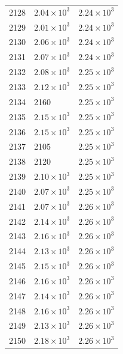 \begin{table}[H]
\begin{tabular}{lll}
2128 & $\displaystyle 2.04 \times 10^{3}$ & $\displaystyle 2.24 \times 10^{3}$ \\
2129 & $\displaystyle 2.01 \times 10^{3}$ & $\displaystyle 2.24 \times 10^{3}$ \\
2130 & $\displaystyle 2.06 \times 10^{3}$ & $\displaystyle 2.24 \times 10^{3}$ \\
2131 & $\displaystyle 2.07 \times 10^{3}$ & $\displaystyle 2.24 \times 10^{3}$ \\
2132 & $\displaystyle 2.08 \times 10^{3}$ & $\displaystyle 2.25 \times 10^{3}$ \\
2133 & $\displaystyle 2.12 \times 10^{3}$ & $\displaystyle 2.25 \times 10^{3}$ \\
2134 & 2160 & $\displaystyle 2.25 \times 10^{3}$ \\
2135 & $\displaystyle 2.15 \times 10^{3}$ & $\displaystyle 2.25 \times 10^{3}$ \\
2136 & $\displaystyle 2.15 \times 10^{3}$ & $\displaystyle 2.25 \times 10^{3}$ \\
2137 & 2105 & $\displaystyle 2.25 \times 10^{3}$ \\
2138 & 2120 & $\displaystyle 2.25 \times 10^{3}$ \\
2139 & $\displaystyle 2.10 \times 10^{3}$ & $\displaystyle 2.25 \times 10^{3}$ \\
2140 & $\displaystyle 2.07 \times 10^{3}$ & $\displaystyle 2.25 \times 10^{3}$ \\
2141 & $\displaystyle 2.07 \times 10^{3}$ & $\displaystyle 2.26 \times 10^{3}$ \\
2142 & $\displaystyle 2.14 \times 10^{3}$ & $\displaystyle 2.26 \times 10^{3}$ \\
2143 & $\displaystyle 2.16 \times 10^{3}$ & $\displaystyle 2.26 \times 10^{3}$ \\
2144 & $\displaystyle 2.13 \times 10^{3}$ & $\displaystyle 2.26 \times 10^{3}$ \\
2145 & $\displaystyle 2.15 \times 10^{3}$ & $\displaystyle 2.26 \times 10^{3}$ \\
2146 & $\displaystyle 2.16 \times 10^{3}$ & $\displaystyle 2.26 \times 10^{3}$ \\
2147 & $\displaystyle 2.14 \times 10^{3}$ & $\displaystyle 2.26 \times 10^{3}$ \\
2148 & $\displaystyle 2.16 \times 10^{3}$ & $\displaystyle 2.26 \times 10^{3}$ \\
2149 & $\displaystyle 2.13 \times 10^{3}$ & $\displaystyle 2.26 \times 10^{3}$ \\
2150 & $\displaystyle 2.18 \times 10^{3}$ & $\displaystyle 2.26 \times 10^{3}$ \\

\end{tabular}
\end{table}
